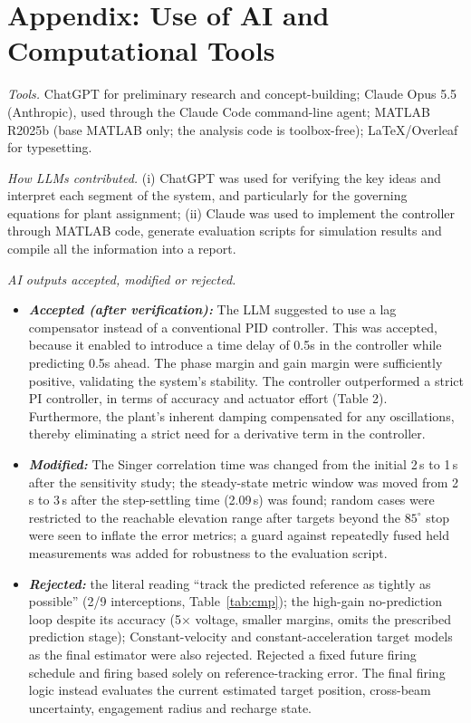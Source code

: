 \documentclass[conference]{IEEEtran}
\begin{document}
\clearpage
\section*{Appendix: Use of AI and Computational Tools}
\textit{Tools.} ChatGPT for preliminary research and concept-building; Claude Opus 5.5 (Anthropic), used through the Claude Code
command-line agent; MATLAB R2025b (base MATLAB only; the analysis code is
toolbox-free); LaTeX/Overleaf for typesetting.

\textit{How LLMs contributed.} (i) ChatGPT was used for verifying the key ideas and  interpret each segment of the system, and particularly for the governing equations for plant
assignment; (ii) Claude was used to implement the controller through MATLAB code, generate evaluation scripts for simulation results and compile all the information into a report.

\textit{AI outputs accepted, modified or rejected.}
\begin{itemize}
\item \emph{\textbf{Accepted (after verification):}} The LLM suggested to use a lag compensator instead of a conventional PID controller. This was accepted, because it enabled to introduce a time delay of 0.5s in the controller while predicting 0.5s ahead. The phase margin and gain margin were sufficiently positive, validating the system's stability. The controller outperformed a strict PI controller, in terms of accuracy and actuator effort (Table 2). Furthermore, the plant's inherent damping compensated for any oscillations, thereby eliminating a strict need for a derivative term in the controller.
\item \emph{\textbf{Modified:}} The Singer correlation time was changed from the initial
2\,s to 1\,s after the sensitivity study; the steady-state metric window was
moved from 2\,s to 3\,s after the step-settling time (2.09\,s) was found; random
cases were restricted to the reachable elevation range after targets beyond the
$85^\circ$ stop were seen to inflate the error metrics; a guard against
repeatedly fused held measurements was added for robustness to the evaluation
script.
\item \emph{\textbf{Rejected:}} the literal reading ``track the predicted reference as
tightly as possible'' (2/9 interceptions, Table~\ref{tab:cmp}); the high-gain
no-prediction loop despite its accuracy (5$\times$ voltage, smaller margins,
omits the prescribed prediction stage);  Constant-velocity and constant-acceleration target models as the final estimator were also rejected. Rejected a fixed future firing schedule and firing based solely on reference-tracking error. The final firing logic instead evaluates the current estimated target position, cross-beam uncertainty, engagement radius and recharge state.




\end{itemize}
\end{document}
